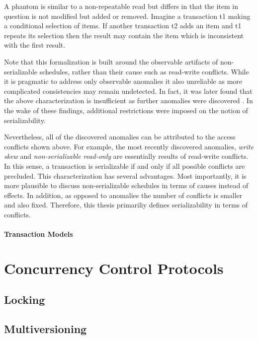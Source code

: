 A phantom is similar to a non-repeatable read but differs in that the item in
question is not modified but added or removed. Imagine a transaction t1 making a
conditional selection of items. If another transaction t2 adds an item and t1
repeats its selection then the result may contain the item which is inconsistent
with the first result.

Note that this formalization is built around the observable artifacts of
non-serializable schedules, rather than their cause such as read-write
conflicts. While it is pragmatic to address only observable anomalies it also
unreliable as more complicated consistencies may remain undetected. In fact, it
was later found that the above characterization is insufficient as further
anomalies were discovered \cite{berenson1995critique, fekete2004read}. In the
wake of these findings, additional restrictions were imposed on the notion of
serializability.

Nevertheless, all of the discovered anomalies can be attributed to the access
conflicts shown above. For example, the most recently discovered anomalies,
\emph{write skew} and \emph{non-serializable read-only} are essentially results
of read-write conflicts. In this sense, a transaction is serializable if and
only if all possible conflicts are precluded. This characterization has several
advantages. Most importantly, it is more plausible to discuss non-serializable
schedules in terms of causes instead of effects. In addition, as opposed to
anomalies the number of conflicts is smaller and also fixed. Therefore, this
thesis primariliy defines serializability in terms of conflicts.

\paragraph{Transaction Models}


\section{Concurrency Control Protocols}

\subsection{Locking}

\subsection{Multiversioning}

